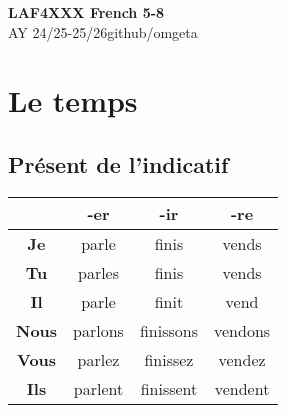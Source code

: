 \documentclass[12pt, a4paper]{article}
\newcommand{\mytitle}{LAF4XXX French 5-8}
\newcommand{\myauthor}{github/omgeta}
\newcommand{\mydate}{AY 24/25-25/26}
\begin{document}
\raggedright
\footnotesize
\begin{multicols*}{3}
\setlength{\premulticols}{1pt}
\setlength{\postmulticols}{1pt}
\setlength{\multicolsep}{1pt}
\setlength{\columnsep}{2pt}

{\normalsize{\textbf{\mytitle}}} \\
{\footnotesize{\mydate\hspace{2pt}\textemdash\hspace{2pt}\myauthor}}

\section{Le temps}
\subsection{Présent de l'indicatif}
\begin{center}
\begin{tabular}{|c|c|c|c|}
  \hline
  & \textbf{-er} & \textbf{-ir} & \textbf{-re}\\\hline
  \textbf{Je} & parle & finis & vends \\\hline
  \textbf{Tu} & parles & finis & vends \\\hline
  \textbf{Il} & parle & finit & vend \\\hline
  \textbf{Nous} & parlons & finissons & vendons \\\hline
  \textbf{Vous} & parlez & finissez & vendez \\\hline
  \textbf{Ils} & parlent & finissent & vendent \\\hline
\end{tabular}
\end{center}


\end{multicols*}
\end{document}
